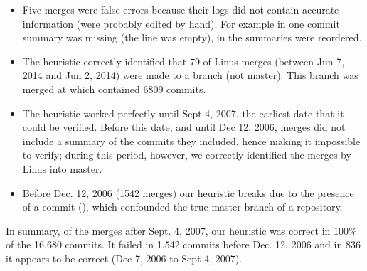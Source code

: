 \begin{itemize}

  \item

    Five merges were false-errors because their logs did not contain
    accurate information (were probably edited by hand). For example in
     one commit summary was missing (the line was
    empty), in  the summaries were reordered.

  \item

    The heuristic correctly identified that 79 of Linus merges (between
    Jun 7, 2014 and Jun 2, 2014) were made to a branch (not master).
    This branch was merged at  which contained 6809
    commits.

  \item

    The heuristic worked perfectly until Sept 4, 2007, the earliest date
    that it could be verified.  Before this date, and until Dec 12,
    2006, merges did not include a summary of the commits they included,
    hence making it impossible to verify; during this period, however,
    we correctly identified the merges by Linus into master.

  \item

    Before Dec. 12, 2006 (1542 merges) our heuristic breaks due to the
    presence of a \foxtrot commit (),
    which confounded the true master branch of a repository.

\end{itemize}

In summary, of the merges after Sept. 4, 2007, our heuristic was correct
in 100\% of the 16,680 commits. It failed in 1,542 commits before Dec.
12, 2006 and in 836 it appears to be correct (Dec 7, 2006 to Sept 4,
2007).
